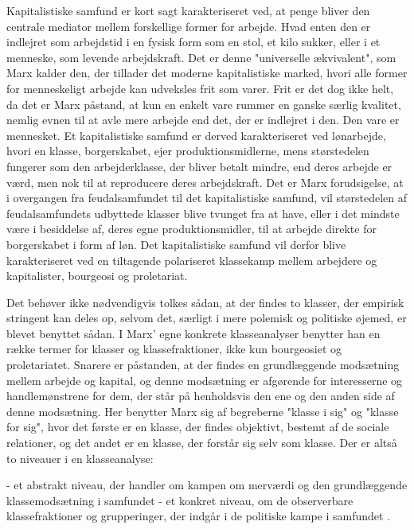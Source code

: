 Kapitalistiske samfund er kort sagt karakteriseret ved, at penge bliver den centrale mediator mellem forskellige former for arbejde. Hvad enten den er indlejret som arbejdstid i en fysisk form som en stol, et kilo sukker, eller i et menneske, som levende arbejdskraft. Det er denne "universelle ækvivalent", som Marx kalder den, der tillader det moderne kapitalistiske marked, hvori alle former for menneskeligt arbejde kan udveksles frit som varer. Frit er det dog ikke helt, da det er Marx påstand, at kun en enkelt vare rummer en ganske særlig kvalitet, nemlig evnen til at avle mere arbejde end det, der er indlejret i den. Den vare er mennesket. Et kapitalistiske samfund er derved karakteriseret ved lønarbejde, hvori en klasse, borgerskabet, ejer produktionsmidlerne, mens størstedelen fungerer som den arbejderklasse, der bliver betalt mindre, end deres arbejde er værd, men nok til at reproducere deres arbejdskraft. Det er Marx forudsigelse, at i overgangen fra feudalsamfundet til det kapitalistiske samfund, vil størstedelen af feudalsamfundets udbyttede klasser blive tvunget fra at have, eller i det mindste være i besiddelse af, deres egne produktionsmidler, til at arbejde direkte for borgerskabet i form af løn. Det kapitalistiske samfund vil derfor blive karakteriseret ved en tiltagende polariseret klassekamp mellem arbejdere og kapitalister, bourgeosi og proletariat.

Det behøver ikke nødvendigvis tolkes sådan, at der findes to klasser, der empirisk stringent kan deles op, selvom det, særligt i mere polemisk og politiske øjemed, er blevet benyttet sådan. I Marx' egne konkrete klasseanalyser benytter han en række termer for klasser og klassefraktioner, ikke kun bourgeosiet og proletariatet. Snarere er påstanden, at der findes en grundlæggende modsætning mellem arbejde og kapital, og denne modsætning er afgørende for interesserne og handlemønstrene for dem, der står på henholdsvis den ene og den anden side af denne modsætning. Her benytter Marx sig af begreberne "klasse i sig" og "klasse for sig", hvor det første er en klasse, der findes objektivt, bestemt af de sociale relationer, og det andet er en klasse, der forstår sig selv som klasse. Der er altså to niveauer i en klasseanalyse:

- et abstrakt niveau, der handler om kampen om merværdi og den grundlæggende klassemodsætning i samfundet
- et konkret niveau, om de observerbare klassefraktioner og grupperinger, der indgår i de politiske kampe i samfundet \parencite[26]{Harrits2014}. %

